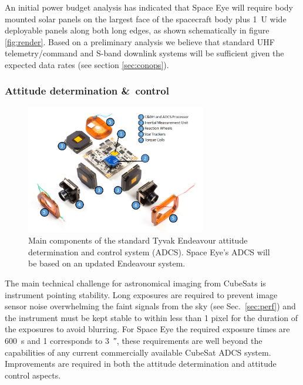 \documentclass[]{iac}
\begin{document}
An initial power budget analysis has indicated that Space Eye will require body mounted solar panels on the largest face
of the spacecraft body plus \SI{1}{U} wide deployable panels along both long edges, as shown schematically in figure
\ref{fig:render}. Based on a preliminary analysis we believe that standard UHF telemetry/command and S-band downlink
systems will be sufficient given the expected data rates (see section \ref{sec:conops})\cite{Reisenfeld2015}.

\subsubsection{Attitude determination \&\ control}
\label{sec:adcs}

\begin{figure}[tp]
  \center \includegraphics[width=0.7\textwidth]{figures/adcs.png}
  \caption{\label{fig:adcs}Main components of the standard Tyvak Endeavour attitude determination and control system
    (ADCS). Space Eye's ADCS will be based on an updated Endeavour system.}
\end{figure}

The main technical challenge for astronomical imaging from CubeSats is instrument pointing stability. Long exposures are
required to prevent image sensor noise overwhelming the faint signals from the sky (see Sec.~\ref{sec:perf}) and the
instrument must be kept stable to within less than 1 pixel for the duration of the exposures to avoid blurring.  For
Space Eye the required exposure times are \SI{600}{\second} and \SI{1}{\pix} corresponds to \SI{3}{\arcsecond}, these
requirements are well beyond the capabilities of any current commercially available CubeSat ADCS system.  Improvements
are required in both the attitude determination and attitude control aspects.
\end{document}
